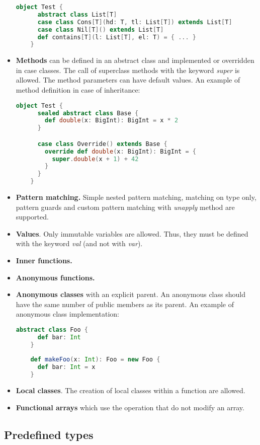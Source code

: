 \begin{itemize}
  \begin{lstlisting}[language=Scala]
    object Test {
      abstract class List[T]
      case class Cons[T](hd: T, tl: List[T]) extends List[T]
      case class Nil[T]() extends List[T]
      def contains[T](l: List[T], el: T) = { ... }
    }
  \end{lstlisting}
  \item \textbf{Methods} can be defined in an abstract class and implemented or overridden in case classes. 
  The call of superclass methods with the keyword \textit{super} is allowed. 
  The method parameters can have default values. 
  An example of method definition in case of inheritance:
  \begin{lstlisting}[language=Scala]
    object Test {
      sealed abstract class Base {
        def double(x: BigInt): BigInt = x * 2
      }

      case class Override() extends Base {
        override def double(x: BigInt): BigInt = {
          super.double(x + 1) + 42
        }
      }
    }
  \end{lstlisting}
  \item \textbf{Pattern matching.} 
  Simple nested pattern matching, matching on type only, pattern guards and custom pattern matching with \textit{unapply} method are supported.
  \item \textbf{Values}. 
  Only immutable variables are allowed. Thus, they must be defined with the keyword \textit{val} (and not with \textit{var}).
  \item \textbf{Inner functions.}
  \item \textbf{Anonymous functions.}
  \item \textbf{Anonymous classes} with an explicit parent. 
  An anonymous class should have the same number of public members as its parent.
  An example of anonymous class implementation:
  \begin{lstlisting}[language=Scala]
    abstract class Foo {
      def bar: Int
    }
    
    def makeFoo(x: Int): Foo = new Foo {
      def bar: Int = x
    }
  \end{lstlisting}
  \item \textbf{Local classes}. 
  The creation of local classes within a function are allowed. \cite{Stainless:pure_scala}
  \item \textbf{Functional arrays} which use the operation that do not modify an array.
\end{itemize}

\subsection{Predefined types}

